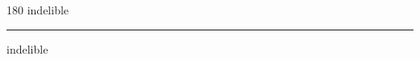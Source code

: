
\begin{frame}
\begin{center}
\begin{turn}{180}
{\fontsize{2.5cm}{1em}\selectfont indelible}
\end{turn}
\vspace{1em}\par  
\hrule
\vspace{1em}\par  
{\fontsize{2.5cm}{1em}\selectfont indelible}
\end{center}
\end{frame}
